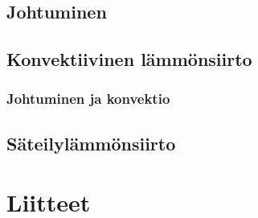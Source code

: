 \documentclass[12pt,a4paper,finnish]{book}
\begin{document}
\chapter{Johtuminen}

\chapter{Konvektiivinen lämmönsiirto}
\section{Johtuminen ja konvektio}

\chapter{Säteilylämmönsiirto}

\part*{Liitteet} %

% 
% 
\end{document}
